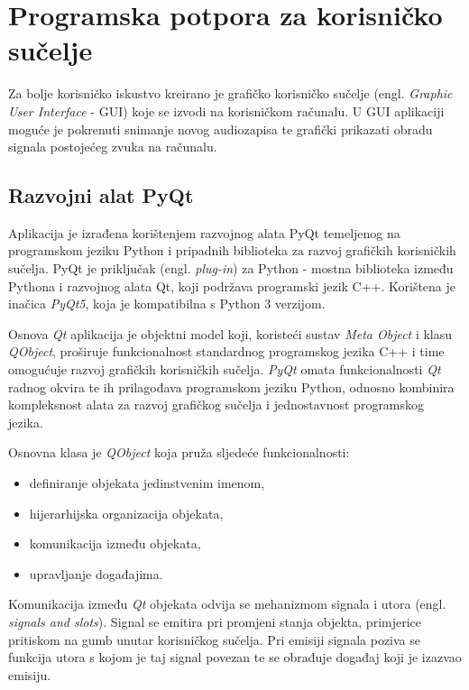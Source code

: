 \chapter{Programska potpora za korisničko sučelje}

Za bolje korisničko iskustvo kreirano je grafičko korisničko sučelje (engl. \textit{Graphic User Interface} - GUI) koje se izvodi na korisničkom računalu. U GUI aplikaciji moguće je pokrenuti snimanje novog audiozapisa te grafički prikazati obradu signala postojećeg zvuka na računalu. 

\section{Razvojni alat PyQt} 
Aplikacija je izrađena korištenjem razvojnog alata PyQt temeljenog na programskom
jeziku Python i pripadnih biblioteka za razvoj grafičkih korisničkih sučelja. PyQt je priključak (engl. \textit{plug-in}) za Python - mostna biblioteka između Pythona i razvojnog alata Qt, koji podržava programski jezik C++. Korištena je inačica \textit{PyQt5}, koja je kompatibilna s Python 3 verzijom.

Osnova \textit{Qt} aplikacija je objektni model koji, koristeći sustav \textit{Meta Object} i klasu \textit{QObject}, proširuje funkcionalnost standardnog programskog jezika C++ i time omogućuje razvoj grafičkih korisničkih sučelja. \textit{PyQt} omata funkcionalnosti \textit{Qt} radnog okvira te ih prilagođava programskom jeziku Python, odnosno kombinira kompleksnost alata za razvoj grafičkog sučelja i jednostavnost programskog jezika.

Osnovna klasa je \textit{QObject} koja pruža sljedeće funkcionalnosti:
\begin{itemize}
	\item definiranje objekata jedinstvenim imenom,
	\item hijerarhijska organizacija objekata,
	\item komunikacija između objekata, 
	\item upravljanje događajima.
\end{itemize}

Komunikacija između \textit{Qt} objekata odvija se mehanizmom signala i utora (engl. \textit{signals and slots}). Signal se emitira pri promjeni stanja objekta, primjerice pritiskom na gumb unutar korisničkog sučelja. Pri emisiji signala poziva se funkcija utora s kojom je taj signal povezan te se obrađuje događaj koji je izazvao emisiju. 

